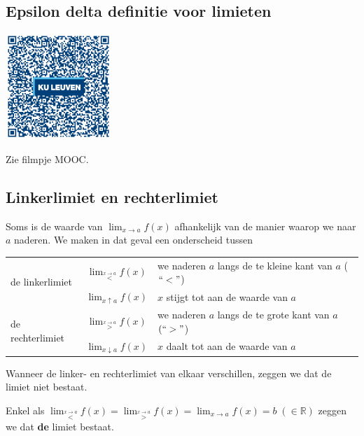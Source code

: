 \subsection{Epsilon delta definitie voor limieten}
\begin{minipage}{.25\linewidth}
	\raggedright
	\includegraphics[width=4cm]{2_elem_rekenvaardigheden_B/inputs/QR_Code_EPSILONDELTA_module2new}
\end{minipage}
\begin{minipage}{.7\linewidth}
	Zie filmpje MOOC.
\end{minipage}

\subsection{Linkerlimiet en rechterlimiet}

Soms is de waarde van $\lim_{x\to a}f(x)$ afhankelijk
van de manier waarop we naar $a$ naderen. We maken in dat geval een
onderscheid tussen


\begin{center}
	\begin{tabular}{lcl}
	\multirow{2}{*}{de linkerlimiet} & $\lim_{\overset{x\rightarrow a}{<}}f(x)$ & we naderen $a$ langs de te kleine kant van $a$ ($\lyxmathsym{\textquotedblleft}<\lyxmathsym{\textquotedblright}$)\\
	& $\lim_{x\uparrow a}f(x)$ & $x$ stijgt tot aan de waarde van $a$\\
	\multirow{2}{*}{de rechterlimiet} & $\lim_{\overset{x\rightarrow a}{>}}f(x)$ & we naderen $a$ langs de te grote kant van $a$ $(\lyxmathsym{\textquotedblleft}>\lyxmathsym{\textquotedblright}$)\\
	& $\lim_{x\downarrow a}f(x)$ & $x$ daalt tot aan de waarde van $a$\\
\end{tabular}
\end{center}

Wanneer de linker- en rechterlimiet van elkaar verschillen,
zeggen we dat de limiet niet bestaat. 

Enkel als $\lim_{\overset{x\rightarrow a}{<}}f(x)=\lim_{\overset{x\rightarrow a}{>}}f(x)=\lim_{x\to a}f(x)=b\;(\in\mathbb{R})$
zeggen we dat \textbf{de} limiet bestaat.

